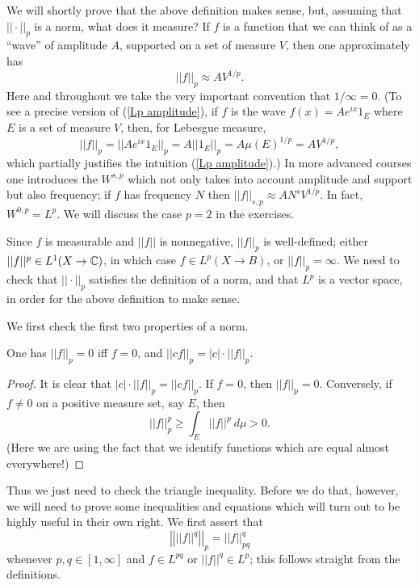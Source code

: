 We will shortly prove that the above definition makes sense, but, assuming that $||\cdot||_{p} $ is a norm, what does it measure?
If $f$ is a function that we can think of as a ``wave'' of amplitude $A$, supported on a set of measure $V$, then one approximately has
\begin{equation}\label{Lp amplitude}
||f||_{p}  \approx AV^{1/p}.
\end{equation}
Here and throughout we take the very important convention that $1/\infty = 0$.
(To see a precise version of (\ref{Lp amplitude}), if $f$ is the wave $f(x) = Ae^{ix}1_E$ where $E$ is a set of measure $V$, then, for Lebesgue measure,
\[||f||_{p}  = ||Ae^{ix}1_E||_{p}  = A ||1_E||_{p}  = A\mu(E)^{1/p} = AV^{1/p},\]
which partially justifies the intuition (\ref{Lp amplitude}).)
In more advanced courses one introduces the  $W^{s,p}$ which not only takes into account amplitude and support but also frequency; if $f$ has frequency $N$ then $||f||_{s,p} \approx AN^sV^{1/p}$.
In fact, $W^{0,p} = L^p$.
We will discuss the case $p = 2$ in the exercises.

Since $f$ is measurable and $||f||$ is nonnegative, $||f||_{p} $ is well-defined; either $||f||^{p} \in L^1(X \to \mathbb{C})$, in which case $f \in L^p(X \to B)$, or $||f||_{p}  = \infty$.
We need to check that $||\cdot||_{p} $ satisfies the definition of a norm, and that $L^p$ is a vector space, in order for the above definition to make sense.

We first check the first two properties of a norm.
\begin{lemma}
One has $||f||_{p}  = 0$ iff $f = 0$, and $||cf||_{p}  = |c|\cdot||f||_{p} $.
\end{lemma}
\begin{proof}
It is clear that $|c|\cdot||f||_{p}  = ||cf||_{p} $.
If $f = 0$, then $||f||_{p}  = 0$.
Conversely, if $f \neq 0$ on a positive measure set, say $E$, then
\[||f||_{p} ^{p} \geq \int_{E} ||f||^{p} ~d\mu > 0.\]
(Here we are using the fact that we identify functions which are equal almost everywhere!)
\end{proof}

Thus we just need to check the triangle inequality. Before we do that, however, we will need to prove some inequalities and equations which will turn out to be highly useful in their own right.
We first assert that
\begin{equation}\label{pull exponent of Lp}
\left|\left|||f||^q\right|\right|_{p}  = ||f||_{pq}^q
\end{equation}
whenever $p, q \in [1, \infty]$ and $f \in L^{pq}$ or $||f||^{q} \in L^p$; this follows straight from the definitions.

